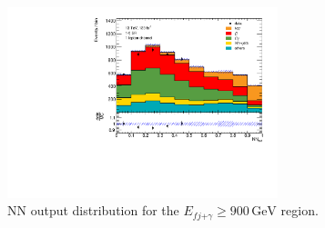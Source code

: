 \begin{figure}
    \centering
    \includegraphics[width=0.7\textwidth]{Plots/NN_out_mixfjphA900.pdf}
    \caption{NN output distribution for the $E_{fj\text{+}\gamma} \geq 900\,\si{\giga\electronvolt}$ region.}
    \label{fig:outputA900fjph_e}
\end{figure} 


